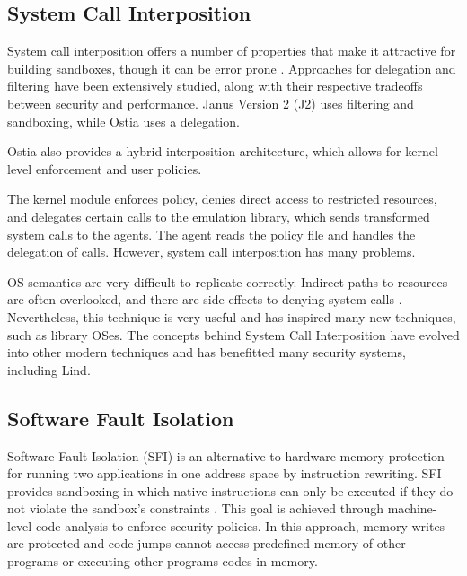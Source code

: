 \subsection{System Call Interposition}

System call interposition offers a number of properties that make it attractive for building sandboxes, though it can be error prone \cite{SCI-04}. Approaches for delegation and filtering have been extensively studied, 
along with their respective tradeoffs between security and performance. 
Janus Version 2 (J2) \cite{Janus0:96, Janus:99} uses filtering and sandboxing, while Ostia \cite{SCI-04} uses a delegation. 

Ostia also provides a hybrid interposition architecture, which allows for kernel level enforcement and user policies. 

The kernel module enforces policy, denies direct access to restricted resources, 
and delegates certain calls to the emulation library, which sends transformed system calls to the agents. 
The agent reads the policy file and handles the delegation of calls. However, system call interposition has many problems.

OS semantics are very difficult to replicate correctly. Indirect paths to resources are often overlooked, 
and there are side effects to denying system calls \cite{Problems-SCI}. 
Nevertheless, this technique is very useful and has inspired many new techniques, such as library OSes. 
The concepts behind System Call Interposition have evolved into other modern techniques 
and has benefitted many security systems, including Lind. 

\subsection{Software Fault Isolation}
Software Fault Isolation (SFI) is an alternative to hardware memory protection for running two applications in one address space by instruction rewriting. SFI provides sandboxing in which native instructions can only be executed if they do not violate the sandbox's constraints \cite{SFI:93}. This goal is achieved through machine-level code analysis to enforce security policies. In this approach, memory writes are protected and code jumps cannot access predefined memory of other programs or executing other programs codes in memory. 


